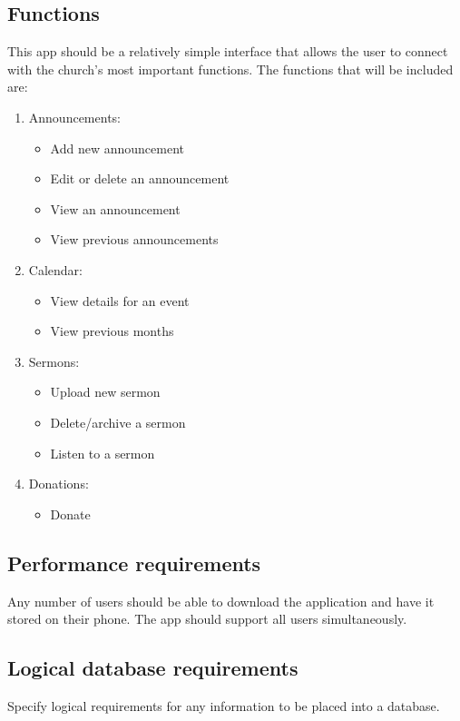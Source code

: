 \documentclass[letterpaper,10pt,draftclsnofoot,onecolumn,compsoc,titlepage]{IEEEtran}
\begin{document}
	\subsection{Functions}
	This app should be a relatively simple interface that allows the user to connect with the church's most important functions.
	The functions that will be included are:
	\begin{enumerate}
		\item{Announcements:}
			\begin{itemize}
				\item{Add new announcement}
				\item{Edit or delete an announcement}
				\item{View an announcement}
				\item{View previous announcements}
			\end{itemize}
		\item{Calendar:}
			\begin{itemize}
				\item{View details for an event}
				\item{View previous months}
			\end{itemize}
		\item{Sermons:}
			\begin{itemize}
				\item{Upload new sermon}
				\item{Delete/archive a sermon}
				\item{Listen to a sermon}
			\end{itemize}
		\item{Donations:}
			\begin{itemize}
				\item{Donate}
			\end{itemize}
	\end{enumerate}


	\subsection{Performance requirements}
	Any number of users should be able to download the application and have it stored on their phone.
	The app should support all users simultaneously.

	\subsection{Logical database requirements}
	Specify logical requirements for any information to be placed into a database.
\end{document}
